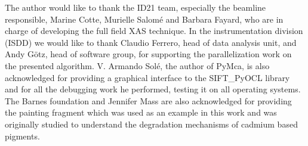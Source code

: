 \documentclass[preprint]{iucr}
\begin{document}

The author would like to thank the ID21 team, especially the beamline
responsible, Marine Cotte, Murielle Salomé and Barbara Fayard, who are in charge
of developing the full field XAS technique.
In the instrumentation division (ISDD) we would like to thank Claudio Ferrero,
head of data analysis unit, and Andy G\"otz, head of software group, for
supporting the parallelization work on the presented algorithm.
V. Armando Solé, the
author of PyMca, is also acknowledged for providing a graphical interface to
the SIFT\_PyOCL library and for all the debugging work he performed, testing
it on all operating systems.
The Barnes foundation and Jennifer Mass are also acknowledged for providing
the painting fragment which was used as an example in this work and was
originally studied to understand the degradation mechanisms of cadmium based
pigments.


\end{document}
